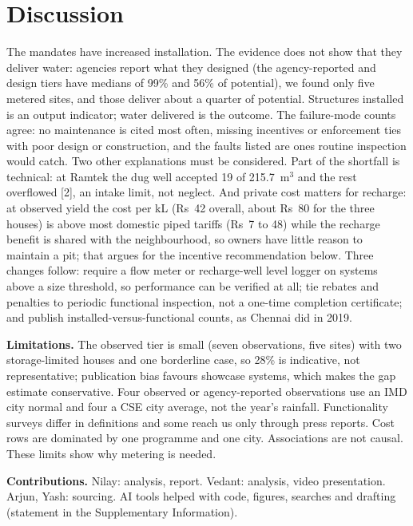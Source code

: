 \section{Discussion}
The mandates have increased installation. The evidence does not show that they deliver water: agencies report what they designed (the agency-reported and design tiers have medians of 99\% and 56\% of potential), we found only five metered sites, and those deliver about a quarter of potential. Structures installed is an output indicator; water delivered is the outcome. The failure-mode counts agree: no maintenance is cited most often, missing incentives or enforcement ties with poor design or construction, and the faults listed are ones routine inspection would catch. Two other explanations must be considered. Part of the shortfall is technical: at Ramtek the dug well accepted 19 of 215.7~m$^3$ and the rest overflowed [2], an intake limit, not neglect. And private cost matters for recharge: at observed yield the cost per kL (Rs~42 overall, about Rs~80 for the three houses) is above most domestic piped tariffs (Rs~7 to 48) while the recharge benefit is shared with the neighbourhood, so owners have little reason to maintain a pit; that argues for the incentive recommendation below. Three changes follow: require a flow meter or recharge-well level logger on systems above a size threshold, so performance can be verified at all; tie rebates and penalties to periodic functional inspection, not a one-time completion certificate; and publish installed-versus-functional counts, as Chennai did in 2019.

\textbf{Limitations.} The observed tier is small (seven observations, five sites) with two storage-limited houses and one borderline case, so 28\% is indicative, not representative; publication bias favours showcase systems, which makes the gap estimate conservative. Four observed or agency-reported observations use an IMD city normal and four a CSE city average, not the year's rainfall. Functionality surveys differ in definitions and some reach us only through press reports. Cost rows are dominated by one programme and one city. Associations are not causal. These limits show why metering is needed.

\textbf{Contributions.} Nilay: analysis, report. Vedant: analysis, video presentation. Arjun, Yash: sourcing. AI tools helped with code, figures, searches and drafting (statement in the Supplementary Information).

